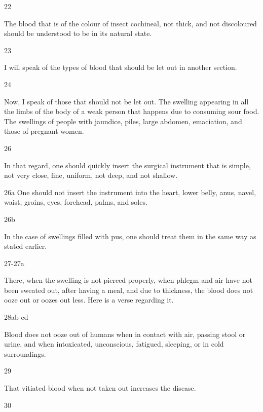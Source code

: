 \begin{translation}
\item[22]

The blood that is of the colour of insect cochineal, not thick, and not discoloured should be understood to be in its natural state. 

\item[23]

I will speak of the types of blood that should be let out in another section. 

\item[24]

Now, I speak of those that should not be let out.
The swelling appearing in all the limbs of the body of a weak person that happens due to consuming sour food. The swellings of people with jaundice, piles, large abdomen, emaciation, and those of pregnant women.

\item[26]

In that regard, one should quickly insert the surgical instrument that is simple, not very close, fine, uniform, not deep, and not shallow. 

\item[26a] 
One should not insert the instrument into the heart, lower belly, anus, navel, waist, groins, eyes, forehead, palms, and soles.

\item[26b]

In the case of swellings filled with pus, one should treat them in the same way as stated earlier.

\item[27-27a]

There, when the swelling is not pierced properly, when phlegm and air have not been sweated out, after having a meal, and due to thickness, the blood does not ooze out or oozes out less.
Here is a verse regarding it.

\item[28ab-cd]

\begin{sloka}
Blood does not ooze out of humans when in contact with air, passing stool or urine, and when intoxicated, unconscious, fatigued, sleeping, or in cold surroundings.
\end{sloka}

\item[29] 

That vitiated blood when not taken out increases the disease.

\item[30]


\end{translation}
